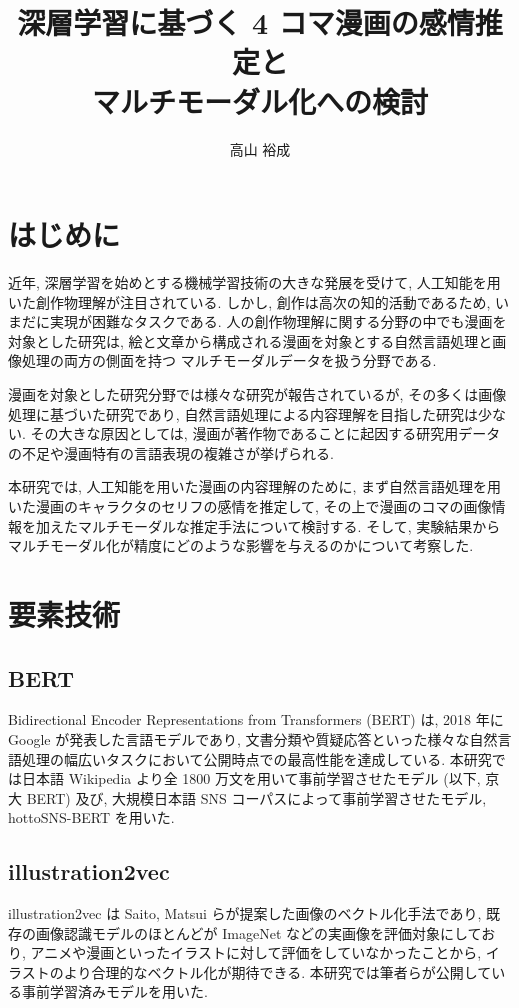 \documentclass[a4paper,twoside,twocolumn,10pt]{jarticle}     %
\title{深層学習に基づく 4 コマ漫画の感情推定と\\マルチモーダル化への検討}
\author{高山 裕成}
\begin{document}
\maketitle %
\small

\section{はじめに}
近年, 深層学習を始めとする機械学習技術の大きな発展を受けて, 人工知能を用いた創作物理解が注目されている.
しかし, 創作は高次の知的活動であるため, いまだに実現が困難なタスクである.
人の創作物理解に関する分野の中でも漫画を対象とした研究は,
絵と文章から構成される漫画を対象とする自然言語処理と画像処理の両方の側面を持つ
マルチモーダルデータを扱う分野である.

漫画を対象とした研究分野では様々な研究が報告されているが,
その多くは画像処理に基づいた研究であり,
自然言語処理による内容理解を目指した研究は少ない.
その大きな原因としては, 漫画が著作物であることに起因する研究用データの不足や漫画特有の言語表現の複雑さが挙げられる.

本研究では, 人工知能を用いた漫画の内容理解のために,
まず自然言語処理を用いた漫画のキャラクタのセリフの感情を推定して,
その上で漫画のコマの画像情報を加えたマルチモーダルな推定手法について検討する.
そして, 実験結果からマルチモーダル化が精度にどのような影響を与えるのかについて考察した.
\section{要素技術}
\subsection{BERT}
Bidirectional Encoder Representations from Transformers (BERT)
 \cite{devlin2018bert} は, 2018 年に Google が発表した言語モデルであり,
 文書分類や質疑応答といった様々な自然言語処理の幅広いタスクにおいて公開時点での最高性能を達成している. 本研究では日本語 Wikipedia より全 1800 万文を用いて事前学習させたモデル \cite{kyoto-bert} (以下, 京大 BERT) 及び, 大規模日本語 SNS コーパスによって事前学習させたモデル, hottoSNS-BERT \cite{hottoSNS-bert} を用いた.

\subsection{illustration2vec}
illustration2vec \cite{i2v} は Saito, Matsui らが提案した画像のベクトル化手法であり, 既存の画像認識モデルのほとんどが ImageNet などの実画像を評価対象にしており, アニメや漫画といったイラストに対して評価をしていなかったことから, イラストのより合理的なベクトル化が期待できる. 本研究では筆者らが公開している事前学習済みモデルを用いた.
\end{document}

